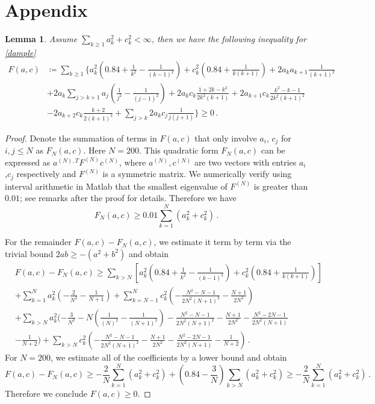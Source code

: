 \documentclass[12pt]{caltech_thesis}
\newtheorem{lemma}[theorem]{Lemma}
\numberwithin{equation}{section}
\begin{document}
\section{Appendix}
\label{sec app}
\begin{lemma}
\label{cap}
    Assume $\sum_{k\geq 1} a_k^2+c_k^2<\infty$, then we have the following inequality for \eqref{dample}
    $$\begin{aligned}
 F(a,c)&\coloneqq \sum_{k\geq1}\{ a_k^2(0.84+\frac{1}{k^2}-\frac{1}{(k-1)^2})+c_k^2(0.84+\frac{1}{k(k+1)})+ 2a_k a_{k+1}\frac{1}{(k+1)^2}\\&+2 a_k \sum_{j>k+1}a_j(\frac{1}{j^2}-\frac{1}{(j-1)^2})+2a_kc_k\frac{1+2k-k^2}{2k^2(k+1)}+2a_{k+1}c_k\frac{k^2-k-1}{2k^2(k+1)^2}\\&-2a_{k+2}c_k\frac{k+2}{2(k+1)^2}+\sum_{j>k}2a_k c_j\frac{1}{j(j+1)}\}\geq0\,.\end{aligned}$$
\end{lemma}
\begin{proof}
    Denote the summation of terms in  $F(a,c)$ that only involve $a_i$, $c_j$ for $i,j\leq N$ as $F_N(a,c)$. Here $N=200$. This quadratic form $F_N(a,c)$ can be expressed as $a^{(N),T}F^{(N)}c^{(N)}$, where $a^{(N)}, c^{(N)}$ are two vectors with entries $a_i$,$c_j$ respectively and $F^{(N)}$ is a symmetric matrix. We numerically verify using interval arithmetic in Matlab that the smallest eigenvalue of $F^{(N)}$ is greater than $0.01$; see remarks after the proof for details. Therefore we have 
    $$F_N(a,c)\geq0.01\sum_{k=1 }^N (a_k^2+c_k^2)\,.$$

For the remainder $F(a,c)-F_N(a,c)$, we estimate it term by term via the trivial bound $2ab\geq-(a^2+b^2)$ and obtain
    $$\begin{aligned}&F(a,c)-F_N(a,c)\geq\sum_{k>N}[ a_k^2(0.84+\frac{1}{k^2}-\frac{1}{(k-1)^2})+c_k^2(0.84+\frac{1}{k(k+1)})] \\&+\sum_{k=1}^{ N} a_k^2(-\frac{2}{N^2}-\frac{1}{N+1}) +\sum_{k=N-1}^{ N} c_k^2(-\frac{N^2-N-1}{2N^2(N+1)^2}-\frac{N+1}{2N^2}) \\&+\sum_{k> N} a_k^2(-\frac{3}{N^2}-N(\frac{1}{(N)^2}-\frac{1}{(N+1)^2})-\frac{N^2-N-1}{2N^2(N+1)^2}-\frac{N+1}{2N^2}-\frac{N^2-2N-1}{2N^2(N+1)}\\&-\frac{1}{N+2})+ \sum_{k> N} c_k^2(-\frac{N^2-N-1}{2N^2(N+1)^2}-\frac{N+1}{2N^2}-\frac{N^2-2N-1}{2N^2(N+1)}-\frac{1}{N+2})\,. \end{aligned}$$
For $N=200$, we estimate all of the coefficients by a lower bound and obtain
    $$F(a,c)-F_N(a,c)\geq -\frac{2}{N}\sum_{k=1}^{ N} (a_k^2+c_k^2)+(0.84-\frac{3}{N})\sum_{k> N} (a_k^2+c_k^2)\geq-\frac{2}{N}\sum_{k=1}^{ N} (a_k^2+c_k^2)\,.$$
    Therefore we conclude $F(a,c)\geq 0$.
\end{proof}
\end{document}
